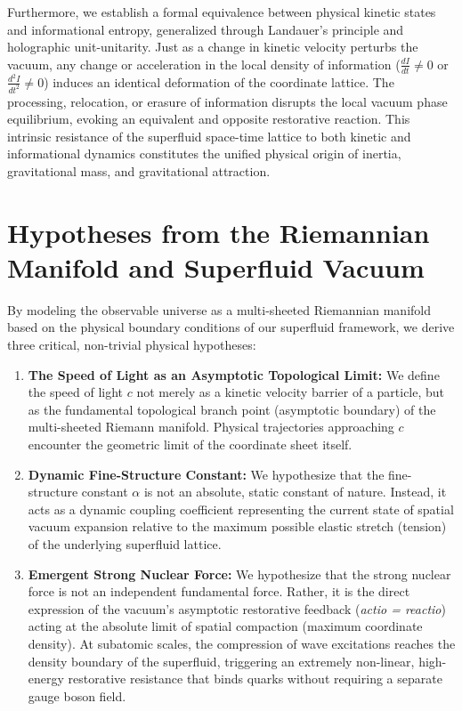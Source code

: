 \documentclass[11pt,a4paper]{article}
\theoremstyle{plain}
\theoremstyle{definition}
\theoremstyle{remark}
\begin{document}
Furthermore, we establish a formal equivalence between physical kinetic states and informational entropy, generalized through Landauer's principle and holographic unit-unitarity. Just as a change in kinetic velocity perturbs the vacuum, any change or acceleration in the local density of information ($\frac{dI}{dt} \neq 0$ or $\frac{d^2I}{dt^2} \neq 0$) induces an identical deformation of the coordinate lattice. The processing, relocation, or erasure of information disrupts the local vacuum phase equilibrium, evoking an equivalent and opposite restorative reaction. This intrinsic resistance of the superfluid space-time lattice to both kinetic and informational dynamics constitutes the unified physical origin of inertia, gravitational mass, and gravitational attraction. 

\section{Hypotheses from the Riemannian Manifold and Superfluid Vacuum}
By modeling the observable universe as a multi-sheeted Riemannian manifold based on the physical boundary conditions of our superfluid framework, we derive three critical, non-trivial physical hypotheses:
\begin{enumerate}
    \item \textbf{The Speed of Light as an Asymptotic Topological Limit:} We define the speed of light $c$ not merely as a kinetic velocity barrier of a particle, but as the fundamental topological branch point (asymptotic boundary) of the multi-sheeted Riemann manifold. Physical trajectories approaching $c$ encounter the geometric limit of the coordinate sheet itself.
    \item \textbf{Dynamic Fine-Structure Constant:} We hypothesize that the fine-structure constant $\alpha$ is not an absolute, static constant of nature. Instead, it acts as a dynamic coupling coefficient representing the current state of spatial vacuum expansion relative to the maximum possible elastic stretch (tension) of the underlying superfluid lattice.
    \item \textbf{Emergent Strong Nuclear Force:} We hypothesize that the strong nuclear force is not an independent fundamental force. Rather, it is the direct expression of the vacuum's asymptotic restorative feedback (\textit{actio = reactio}) acting at the absolute limit of spatial compaction (maximum coordinate density). At subatomic scales, the compression of wave excitations reaches the density boundary of the superfluid, triggering an extremely non-linear, high-energy restorative resistance that binds quarks without requiring a separate gauge boson field.
\end{enumerate}
\end{document}

